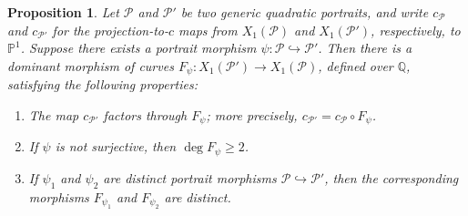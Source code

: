 \documentclass[12pt]{amsart}
\newtheorem{prop}[thm]{Proposition}
\theoremstyle{definition}
\newcommand{\bbP}{\mathbb{P}}
\newcommand{\bbQ}{\mathbb{Q}}
\newcommand{\calP}{\mathcal{P}}
\numberwithin{equation}{section}
\begin{document}
\begin{prop}\label{prop:functoriality}
    Let $\calP$ and $\calP'$ be two generic quadratic portraits, and write $c_\calP$ and $c_{\calP'}$ for the projection-to-$c$ maps from $X_1(\calP)$ and $X_1(\calP')$, respectively, to $\bbP^1$. Suppose there exists a portrait morphism $\psi : \calP \hookrightarrow \calP'$. Then there is a dominant morphism of curves $F_\psi : X_1(\calP') \to X_1(\calP)$, defined over $\bbQ$, satisfying the following properties:
    \begin{enumerate}
        \item The map $c_{\calP'}$ factors through $F_\psi$; more precisely, $c_{\calP'} = c_\calP\circ F_\psi$.
        \item If $\psi$ is not surjective, then $\deg F_\psi \ge 2$.
        \item If $\psi_1$ and $\psi_2$ are distinct portrait morphisms $\calP \hookrightarrow \calP'$, then the corresponding morphisms $F_{\psi_1}$ and $F_{\psi_2}$ are distinct.
    \end{enumerate}
\end{prop}
\end{document}
